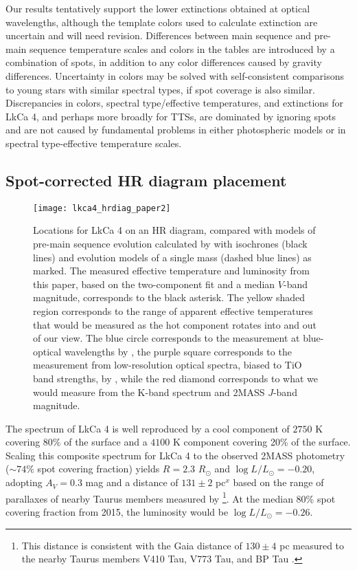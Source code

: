 \documentclass[twocolumn]{emulateapj}%
\begin{document}
Our results tentatively support the lower extinctions obtained at optical wavelengths, although the template colors used to calculate extinction are uncertain and will need revision.  Differences between main sequence and pre-main sequence temperature scales and colors in the \citet{pecaut13} tables are introduced by a combination of spots, in addition to any color differences caused by gravity differences.
Uncertainty in colors may be solved with self-consistent comparisons to young stars with similar spectral types, if spot coverage is also similar.  Discrepancies in colors, spectral type/effective temperatures, and extinctions for LkCa 4, and perhaps more broadly for TTSs, are dominated by ignoring spots and are not caused by fundamental problems in either photospheric models or in spectral type-effective temperature scales.


\subsection{Spot-corrected HR diagram placement}

\begin{figure*}
 \centering
 \texttt{[image: lkca4\_hrdiag\_paper2]}
 \caption{Locations for LkCa 4 on an HR diagram, compared with models of pre-main sequence evolution calculated by \citet{baraffe15} with isochrones (black lines) and evolution models of a single mass (dashed blue lines) as marked.  The measured effective temperature and luminosity from this paper, based on the two-component fit and a median $V$-band magnitude, corresponds to the black asterisk.  The yellow shaded region corresponds to the range of apparent effective temperatures that would be measured as the hot component rotates into and out of our view.  The blue circle corresponds to the measurement at blue-optical wavelengths by \citet{donati14}, the purple square corresponds to the measurement from low-resolution optical spectra, biased to TiO band strengths, by \citet[][biased to]{herczeg14}, while the red diamond corresponds to what we would measure from the K-band spectrum and 2MASS $J$-band magnitude.}
 \label{fig:hrdiag}
\end{figure*}

The spectrum of LkCa 4 is well reproduced by a cool component of $2750$ K covering 80\% of the surface and a $4100$ K component covering 20\% of the surface.   Scaling this composite spectrum for LkCa 4 to the observed 2MASS photometry ($\sim 74\%$ spot covering fraction) yields $R=2.3$ $R_\odot$ and $\log L/L_\odot=-0.20$, adopting $A_V=0.3$ mag and a distance of $131 \pm 2$ pc$^x$ based on the range of parallaxes of nearby Taurus members measured by \citet{torres12}\footnote{This distance is consistent with the Gaia distance of $130 \pm4$ pc measured to the nearby Taurus members V410 Tau, V773 Tau, and BP Tau \citep{gaia2016dr}.}.  
At the median 80\% spot covering fraction from 2015, the luminosity would be $\log L/L_\odot=-0.26$.
\end{document}
